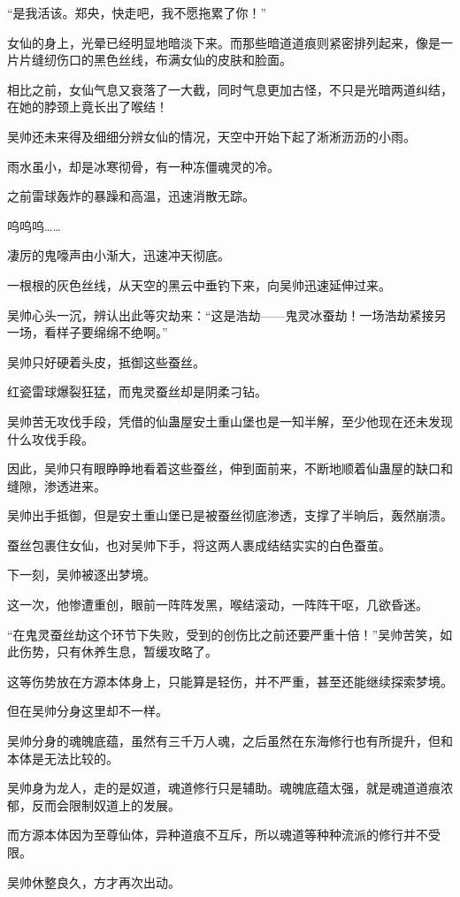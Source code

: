 \begin{this_body}
“是我活该。郑央，快走吧，我不愿拖累了你！”

女仙的身上，光晕已经明显地暗淡下来。而那些暗道道痕则紧密排列起来，像是一片片缝纫伤口的黑色丝线，布满女仙的皮肤和脸面。

相比之前，女仙气息又衰落了一大截，同时气息更加古怪，不只是光暗两道纠结，在她的脖颈上竟长出了喉结！

吴帅还未来得及细细分辨女仙的情况，天空中开始下起了淅淅沥沥的小雨。

雨水虽小，却是冰寒彻骨，有一种冻僵魂灵的冷。

之前雷球轰炸的暴躁和高温，迅速消散无踪。

呜呜呜……

凄厉的鬼嚎声由小渐大，迅速冲天彻底。

一根根的灰色丝线，从天空的黑云中垂钓下来，向吴帅迅速延伸过来。

吴帅心头一沉，辨认出此等灾劫来：“这是浩劫——鬼灵冰蚕劫！一场浩劫紧接另一场，看样子要绵绵不绝啊。”

吴帅只好硬着头皮，抵御这些蚕丝。

红瓷雷球爆裂狂猛，而鬼灵蚕丝却是阴柔刁钻。

吴帅苦无攻伐手段，凭借的仙蛊屋安土重山堡也是一知半解，至少他现在还未发现什么攻伐手段。

因此，吴帅只有眼睁睁地看着这些蚕丝，伸到面前来，不断地顺着仙蛊屋的缺口和缝隙，渗透进来。

吴帅出手抵御，但是安土重山堡已是被蚕丝彻底渗透，支撑了半晌后，轰然崩溃。

蚕丝包裹住女仙，也对吴帅下手，将这两人裹成结结实实的白色蚕茧。

下一刻，吴帅被逐出梦境。

这一次，他惨遭重创，眼前一阵阵发黑，喉结滚动，一阵阵干呕，几欲昏迷。

“在鬼灵蚕丝劫这个环节下失败，受到的创伤比之前还要严重十倍！”吴帅苦笑，如此伤势，只有休养生息，暂缓攻略了。

这等伤势放在方源本体身上，只能算是轻伤，并不严重，甚至还能继续探索梦境。

但在吴帅分身这里却不一样。

吴帅分身的魂魄底蕴，虽然有三千万人魂，之后虽然在东海修行也有所提升，但和本体是无法比较的。

吴帅身为龙人，走的是奴道，魂道修行只是辅助。魂魄底蕴太强，就是魂道道痕浓郁，反而会限制奴道上的发展。

而方源本体因为至尊仙体，异种道痕不互斥，所以魂道等种种流派的修行并不受限。

吴帅休整良久，方才再次出动。


\end{this_body}
